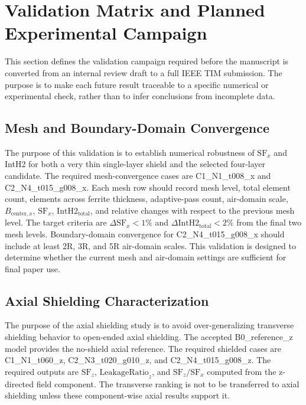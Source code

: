 ﻿\documentclass[letterpaper,journal]{IEEEtran}
\begin{document}
\section{Validation Matrix and Planned Experimental Campaign}

This section defines the validation campaign required before the manuscript is converted from an internal review draft to a full IEEE TIM submission. The purpose is to make each future result traceable to a specific numerical or experimental check, rather than to infer conclusions from incomplete data.

\subsection{Mesh and Boundary-Domain Convergence}

The purpose of this validation is to establish numerical robustness of $\mathrm{SF}_x$ and IntH2 for both a very thin single-layer shield and the selected four-layer candidate. The required mesh-convergence cases are C1\_N1\_t008\_x and C2\_N4\_t015\_g008\_x. Each mesh row should record mesh level, total element count, elements across ferrite thickness, adaptive-pass count, air-domain scale, $B_{\mathrm{center},x}$, $\mathrm{SF}_x$, $\mathrm{IntH2}_{\mathrm{total}}$, and relative changes with respect to the previous mesh level. The target criteria are $\Delta\mathrm{SF}_x<1\%$ and $\Delta\mathrm{IntH2}_{\mathrm{total}}<2\%$ from the final two mesh levels. Boundary-domain convergence for C2\_N4\_t015\_g008\_x should include at least 2R, 3R, and 5R air-domain scales. This validation is designed to determine whether the current mesh and air-domain settings are sufficient for final paper use.

\subsection{Axial Shielding Characterization}

The purpose of the axial shielding study is to avoid over-generalizing transverse shielding behavior to open-ended axial shielding. The accepted B0\_reference\_z model provides the no-shield axial reference. The required shielded cases are C1\_N1\_t060\_z, C2\_N3\_t020\_g010\_z, and C2\_N4\_t015\_g008\_z. The required outputs are $\mathrm{SF}_z$, $\mathrm{LeakageRatio}_z$, and $\mathrm{SF}_z/\mathrm{SF}_x$ computed from the z-directed field component. The transverse ranking is not to be transferred to axial shielding unless these component-wise axial results support it.
\end{document}
